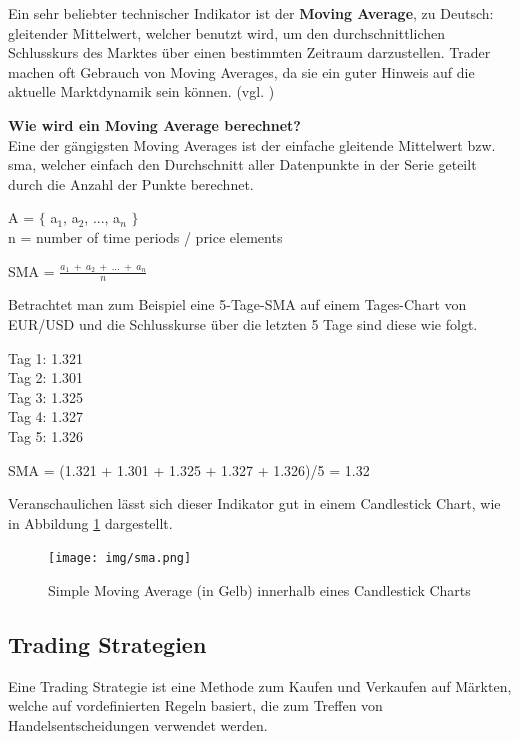 \documentclass[oneside]{ausarbeitung}
\begin{document}
Ein sehr beliebter technischer Indikator ist der \textbf{Moving
Average}, zu Deutsch: gleitender Mittelwert, welcher benutzt wird, um
den durchschnittlichen Schlusskurs des Marktes über einen bestimmten
Zeitraum darzustellen. Trader machen oft Gebrauch von Moving Averages,
da sie ein guter Hinweis auf die aktuelle Marktdynamik sein können.
(vgl. \cite{moving_average})

\textbf{Wie wird ein Moving Average berechnet?} \\
Eine der gängigsten Moving Averages ist der einfache gleitende
Mittelwert bzw. \ac{sma}, welcher einfach den Durchschnitt aller
Datenpunkte in der Serie geteilt durch die Anzahl der
Punkte berechnet\cite{moving_average}.

A = $ \{ $ {a$_{1}$, a$_{2}$, ..., a$_{n}$} $ \} $ \\
n = number of time periods / price elements

SMA = $\frac{a_1 \ + \ a_2 \ + \ ... \ + \ a_n}{n}$

Betrachtet man zum Beispiel eine 5-Tage-SMA auf einem Tages-Chart von
EUR/USD und die Schlusskurse über die letzten 5 Tage sind diese wie folgt.

Tag 1: 1.321 \\
Tag 2: 1.301 \\
Tag 3: 1.325 \\
Tag 4: 1.327 \\
Tag 5: 1.326

SMA = (1.321 + 1.301 + 1.325 + 1.327 + 1.326)/5 = 1.32

Veranschaulichen lässt sich dieser Indikator gut in einem Candlestick
Chart, wie in Abbildung \ref{fig:3} dargestellt.

\begin{figure}[H]
  \centering
  \texttt{[image: img/sma.png]}
  \caption{Simple Moving Average (in Gelb) innerhalb eines Candlestick Charts}
  \label{fig:3}
\end{figure} 

\subsection{Trading Strategien}
\label{sub:trading_strategien}

Eine Trading Strategie ist eine Methode zum Kaufen und Verkaufen auf
Märkten, welche auf vordefinierten Regeln basiert, die zum Treffen von
Handelsentscheidungen verwendet werden\cite{trading_strategy}.
\end{document}
